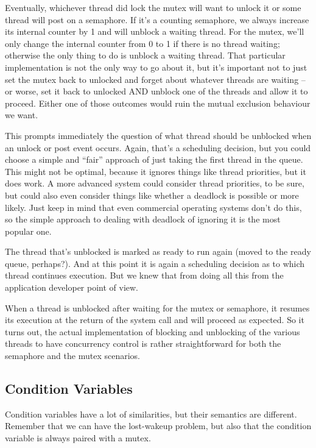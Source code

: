 Eventually, whichever thread did lock the mutex will want to unlock it or some thread will post on a semaphore. If it's a counting semaphore, we always increase its internal counter by 1 and will unblock a waiting thread. For the mutex, we'll only change the internal counter from 0 to 1 if there is no thread waiting; otherwise the only thing to do is unblock a waiting thread. That particular implementation is not the only way to go about it, but it's important not to just set the mutex back to unlocked and forget about whatever threads are waiting -- or worse, set it back to unlocked AND unblock one of the threads and allow it to proceed. Either one of those outcomes would ruin the mutual exclusion behaviour we want.

This prompts immediately the question of what thread should be unblocked when an unlock or post event occurs. Again, that's a scheduling decision, but you could choose a simple and ``fair'' approach of just taking the first thread in the queue. This might not be optimal, because it ignores things like thread priorities, but it does work. A more advanced system could consider thread priorities, to be sure, but could also even consider things like whether a deadlock is possible or more likely. Just keep in mind that even commercial operating systems don't do this, so the simple approach to dealing with deadlock of ignoring it is the most popular one. 

The thread that's unblocked is marked as ready to run again (moved to the ready queue, perhaps?). And at this point it is again a scheduling decision as to which thread continues execution. But we knew that from doing all this from the application developer point of view.

When a thread is unblocked after waiting for the mutex or semaphore, it resumes its execution at the return of the system call and will proceed as expected. So it turns out, the actual implementation of blocking and unblocking of the various threads to have concurrency control is rather straightforward for both the semaphore and the mutex scenarios.


\subsection*{Condition Variables}
Condition variables have a lot of similarities, but their semantics are different. Remember that we can have the lost-wakeup problem, but also that the condition variable is always paired with a mutex.

